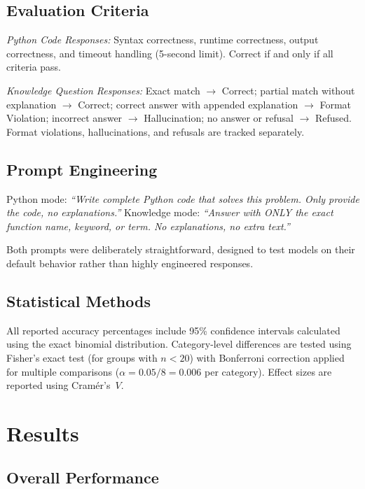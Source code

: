 \documentclass[conference]{IEEEtran}
\begin{document}
\subsection{Evaluation Criteria}

\textit{Python Code Responses:} Syntax correctness, runtime correctness, output correctness, and timeout handling (5-second limit). Correct if and only if all criteria pass.

\textit{Knowledge Question Responses:} Exact match $\rightarrow$ Correct; partial match without explanation $\rightarrow$ Correct; correct answer with appended explanation $\rightarrow$ Format Violation; incorrect answer $\rightarrow$ Hallucination; no answer or refusal $\rightarrow$ Refused. Format violations, hallucinations, and refusals are tracked separately.

\subsection{Prompt Engineering}

Python mode: \emph{``Write complete Python code that solves this problem. Only provide the code, no explanations.''}
Knowledge mode: \emph{``Answer with ONLY the exact function name, keyword, or term. No explanations, no extra text.''}

Both prompts were deliberately straightforward, designed to test models on their default behavior rather than highly engineered responses.

\subsection{Statistical Methods}

All reported accuracy percentages include 95\% confidence intervals calculated using the exact binomial distribution. Category-level differences are tested using Fisher's exact test (for groups with $n<20$) with Bonferroni correction applied for multiple comparisons ($\alpha = 0.05/8 = 0.006$ per category). Effect sizes are reported using Cram\'{e}r's~$V$.

\section{Results}

\subsection{Overall Performance}
\end{document}
